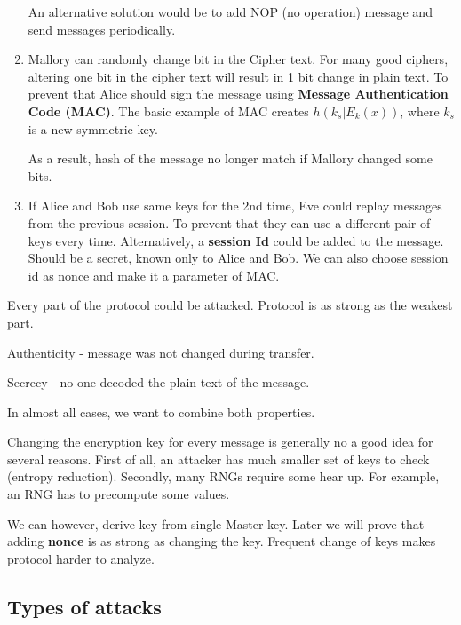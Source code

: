 \begin{example}
\begin{enumerate}
	An alternative solution would be to add NOP (no operation) message and send messages periodically.

	\item Mallory can randomly change bit in the Cipher text. For many good ciphers, altering one bit in the cipher text will result in 1 bit change in plain text.
		To prevent that Alice should sign the message using \textbf{Message Authentication Code (MAC)}. The basic example of MAC creates $h(k_s | E_k(x))$, where $k_s$ is a new symmetric key.

		As a result, hash of the message no longer match if Mallory changed some bits.
	\item If Alice and Bob use same keys for the 2nd time, Eve could replay messages from the previous session. To prevent that they can use a different pair of keys every time.
		Alternatively, a \textbf{session Id} could be added to the message. Should be a secret, known only to Alice and Bob. We can also choose session id as nonce and make it a parameter of MAC.

	\end{enumerate}
\end{example}

\begin{observation}
	Every part of the protocol could be attacked. Protocol is as strong as the weakest part.
\end{observation}

\begin{definition}
	Authenticity - message was not changed during transfer.

	Secrecy - no one decoded the plain text of the message.

	In almost all cases, we want to combine both properties.
\end{definition}

\begin{observation}
	Changing the encryption key for every message is generally no a good idea for several reasons.
	First of all, an attacker has much smaller set of keys to check (entropy reduction).
	Secondly, many RNGs require some hear up. For example, an RNG has to precompute some values.

	We can however, derive key from single Master key. Later we will prove that adding \textbf{nonce} is as strong as changing the key.
	Frequent change of keys makes protocol harder to analyze.
\end{observation}

\subsection{Types of attacks}


